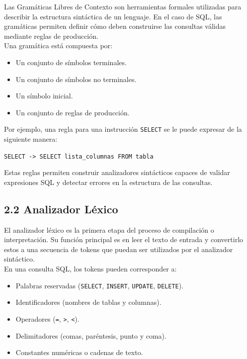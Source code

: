 \documentclass{article}
\begin{document}
Las Gramáticas Libres de Contexto son herramientas formales utilizadas para describir la estructura sintáctica de un lenguaje. En el caso de SQL, las gramáticas permiten definir cómo deben construirse las consultas válidas mediante reglas de producción. \\

Una gramática está compuesta por:
\begin{itemize}
\item Un conjunto de símbolos terminales.
\item Un conjunto de símbolos no terminales.
\item Un símbolo inicial.
\item Un conjunto de reglas de producción.
\end{itemize}

Por ejemplo, una regla para una instrucción \texttt{SELECT} se le puede expresar de la siguiente manera:

\begin{center}
\texttt{SELECT -> SELECT lista\_columnas FROM tabla}
\end{center}

Estas reglas permiten construir analizadores sintácticos capaces de validar expresiones SQL y detectar errores en la estructura de las consultas.

\subsection{2.2 Analizador Léxico}

El analizador léxico es la primera etapa del proceso de compilación o interpretación. Su función principal es en leer el texto de entrada y convertirlo estos a una secuencia de tokens que puedan ser utilizados por el analizador sintáctico. \\

En una consulta SQL, los tokens pueden corresponder a:
\begin{itemize}
\item Palabras reservadas (\texttt{SELECT}, \texttt{INSERT}, \texttt{UPDATE}, \texttt{DELETE}).
\item Identificadores (nombres de tablas y columnas).
\item Operadores (\texttt{=}, \texttt{>}, \texttt{<}).
\item Delimitadores (comas, paréntesis, punto y coma).
\item Constantes numéricas o cadenas de texto.
\end{itemize}
\end{document}
